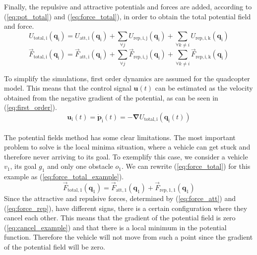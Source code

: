 \documentclass[journal]{IEEEtran}
\newcommand*{\subb}[1]{_{\mathrm{#1}}}
\begin{document}
		Finally, the repulsive and attractive potentials and forces are added, according to (\ref{eq:pot_total}) and (\ref{eq:force_total}), in order to obtain the total potential field and force. 
		\begin{equation} \label{eq:pot_total}
		U\subb{total, i}(\bm{q}\subb{i}) = U\subb{att, i}(\bm{q}\subb{i}) + \sum \limits_{\forall j}U\subb{rep,i,j}(\bm{q}\subb{i}) + \sum \limits_{\forall k \neq i}U\subb{rep,i,k}(\bm{q}\subb{i}) 
		\end{equation}
		\begin{equation} \label{eq:force_total}
		\vec{F}\subb{total, i}(\bm{q}\subb{i}) = \vec{F}\subb{att,i}(\bm{q}\subb{i}) + \sum\limits_{\forall j} \vec{F}\subb{rep,i,j}(\bm{q}\subb{i}) + \sum\limits_{\forall k \neq i} \vec{F}\subb{rep,i,k}(\bm{q}\subb{i})
		\end{equation}
		
		
		To simplify the simulations, first order dynamics are assumed for the quadcopter model. This means that the control signal $\bm{u}(t)$ can be estimated as the velocity obtained from the negative gradient of the potential, as can be seen in (\ref{eq:first_order}).
		\begin{equation} \label{eq:first_order}
		\bm{u}\subb{i}(t) = \bm{\dot p}\subb{i}(t) = -\bm{\nabla}U\subb{total, i}(\bm{q}\subb{i}(t))
		\end{equation}
		\\
		The potential fields method has some clear limitations. The most important problem to solve is the local minima situation, where a vehicle can get stuck and therefore never arriving to its goal. To exemplify this case, we consider a vehicle $v\subb{1}$, its goal $g\subb{1}$ and only one obstacle $o\subb{1}$. We can rewrite (\ref{eq:force_total}) for this example as (\ref{eq:force_total_example}).
		\begin{equation} \label{eq:force_total_example}
			\vec{F}\subb{total, 1}(\bm{q}\subb{1}) = \vec{F}\subb{att,1}(\bm{q}\subb{1}) + \vec{F}\subb{rep,1,1}(\bm{q}\subb{1})
		\end{equation}
		Since the attractive and repulsive forces, determined by (\ref{eq:force_att}) and (\ref{eq:force_rep}), have different signs, there is a certain configuration where they cancel each other. This means that the gradient of the potential field is zero (\ref{eq:cancel_example}) and that there is a local minimum in the potential function. Therefore the vehicle will not move from such a point since the gradient of the potential field will be zero.
	
\end{document}
